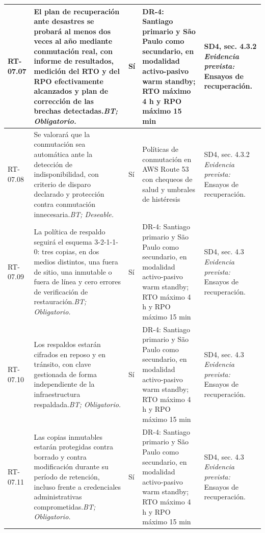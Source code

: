 \begin{paginaHorizontalSynaptix}
\begin{longtable}{|L{0.09\AnchoMatrizTDoce}|L{0.385\AnchoMatrizTDoce}|L{0.065\AnchoMatrizTDoce}|L{0.18\AnchoMatrizTDoce}|L{0.28\AnchoMatrizTDoce}|}
RT-\allowbreak{}07.\allowbreak{}07 &
El plan de recuperación ante desastres se probará al menos dos veces al año mediante conmutación real, con informe de resultados, medición del RTO y del RPO efectivamente alcanzados y plan de corrección de las brechas detectadas.\newline\textit{BT; Obligatorio.} &
Sí &
DR-4: Santiago primario y São Paulo como secundario, en modalidad activo-pasivo warm standby; RTO máximo 4 h y RPO máximo 15 min &
SD4, sec. 4.3.2 \newline\textit{Evidencia prevista:} Ensayos de recuperación. \\ \hline

RT-\allowbreak{}07.\allowbreak{}08 &
Se valorará que la conmutación sea automática ante la detección de indisponibilidad, con criterio de disparo declarado y protección contra conmutación innecesaria.\newline\textit{BT; Deseable.} &
Sí &
Políticas de conmutación en AWS Route 53 con chequeos de salud y umbrales de histéresis &
SD4, sec. 4.3.2 \newline\textit{Evidencia prevista:} Ensayos de recuperación. \\ \hline

RT-\allowbreak{}07.\allowbreak{}09 &
La política de respaldo seguirá el esquema 3-2-1-1-0: tres copias, en dos medios distintos, una fuera de sitio, una inmutable o fuera de línea y cero errores de verificación de restauración.\newline\textit{BT; Obligatorio.} &
Sí &
DR-4: Santiago primario y São Paulo como secundario, en modalidad activo-pasivo warm standby; RTO máximo 4 h y RPO máximo 15 min &
SD4, sec. 4.3 \newline\textit{Evidencia prevista:} Ensayos de recuperación. \\ \hline

RT-\allowbreak{}07.\allowbreak{}10 &
Los respaldos estarán cifrados en reposo y en tránsito, con clave gestionada de forma independiente de la infraestructura respaldada.\newline\textit{BT; Obligatorio.} &
Sí &
DR-4: Santiago primario y São Paulo como secundario, en modalidad activo-pasivo warm standby; RTO máximo 4 h y RPO máximo 15 min &
SD4, sec. 4.3 \newline\textit{Evidencia prevista:} Ensayos de recuperación. \\ \hline

RT-\allowbreak{}07.\allowbreak{}11 &
Las copias inmutables estarán protegidas contra borrado y contra modificación durante su período de retención, incluso frente a credenciales administrativas comprometidas.\newline\textit{BT; Obligatorio.} &
Sí &
DR-4: Santiago primario y São Paulo como secundario, en modalidad activo-pasivo warm standby; RTO máximo 4 h y RPO máximo 15 min &
SD4, sec. 4.3 \newline\textit{Evidencia prevista:} Ensayos de recuperación. \\ \hline


\end{longtable}
\end{paginaHorizontalSynaptix}
